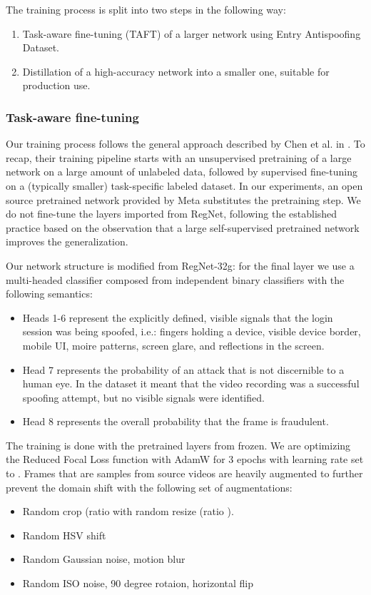 \documentclass[10pt,twocolumn,letterpaper]{article}
\begin{document}
The training process is split into two steps in the following way:
\begin{enumerate}
    \item Task-aware fine-tuning (TAFT) of a larger network using Entry Antispoofing Dataset. 
    \item Distillation of a high-accuracy network into a smaller one, suitable for production use.
\end{enumerate}

\subsubsection{Task-aware fine-tuning}

Our training process follows the general approach described by Chen et al. in \cite{big-self-supervised}. To recap, their training pipeline starts with an unsupervised pretraining of a large network on a large amount of unlabeled data, followed by supervised fine-tuning on a (typically smaller) task-specific labeled dataset. In our experiments, an open source pretrained network provided by Meta \cite{SEER} substitutes the pretraining step. We do not fine-tune the layers imported from RegNet, following the established practice \cite{big-self-supervised} \cite{SEER} based on the observation that a large self-supervised pretrained network improves the generalization.

Our network structure is modified from RegNet-32g\cite{SEER}: for the final layer we use a multi-headed classifier composed from  independent binary classifiers with the following semantics:

\begin{itemize}
    \item Heads 1-6 represent the explicitly defined, visible signals that the login session was being spoofed, i.e.: fingers holding a device, visible device border, mobile UI, moire patterns, screen glare, and reflections in the screen.
    \item Head 7 represents the probability of an attack that is not discernible to a human eye. In the dataset it meant that the video recording was a successful spoofing attempt, but no visible signals were identified.
    \item Head 8 represents the overall probability that the frame is fraudulent.
\end{itemize}

The training is done with the pretrained layers from \cite{SEER} frozen. We are optimizing the Reduced Focal Loss function \cite{ReducedFocalLoss} with AdamW\cite{AdamW} for 3 epochs with learning rate set to . Frames that are samples from source videos are heavily augmented to further prevent the domain shift with the following set of augmentations:
\begin{itemize}
    \item Random crop (ratio  with random resize (ratio ).
    \item Random HSV shift
    \item Random Gaussian noise, motion blur
    \item Random ISO noise, 90 degree rotaion, horizontal flip
\end{itemize}
\end{document}
